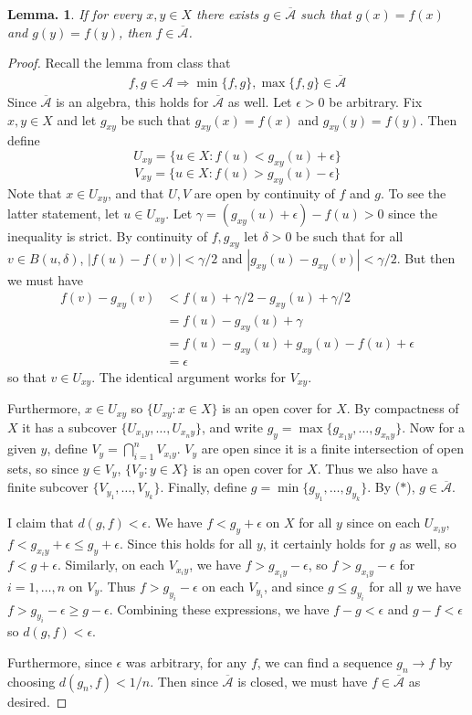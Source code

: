 \documentclass[11pt, a4paper]{memoir}
\theoremstyle{change}
\newtheorem{lemma}[theorem]{Lemma.}
\theoremstyle{plain}
\theoremstyle{nonumberplain}
\newtheorem{proof}{Proof}
\numberwithin{equation}{section}
\begin{document}
\begin{lemma}
    If for every $x,y\in X$ there exists $g\in\overline{\mathcal{A}}$ such that $g(x)=f(x)$ and $g(y)=f(y)$, then $f\in\overline{\mathcal{A}}$.
\end{lemma}
\begin{proof}
    Recall the lemma from class that
    \begin{align*}
        f,g\in\mathcal{A}\Rightarrow\min\{f,g\},\max\{f,g\}\in\overline{\mathcal{A}}\tag{$*$}
    \end{align*}
    Since $\overline{\mathcal{A}}$ is an algebra, this holds for $\overline{\mathcal{A}}$ as well.
    Let $\epsilon>0$ be arbitrary.
    Fix $x,y\in X$ and let $g_{xy}$ be such that $g_{xy}(x)=f(x)$ and $g_{xy}(y)=f(y)$.
    Then define
    \[U_{xy}=\{u\in X:f(u)<g_{xy}(u)+\epsilon\}\]
    \[V_{xy}=\{u\in X:f(u)>g_{xy}(u)-\epsilon\}\]
    Note that $x\in U_{xy}$, and that $U,V$ are open by continuity of $f$ and $g$.
    To see the latter statement, let $u\in U_{xy}$.
    Let $\gamma=(g_{xy}(u)+\epsilon)-f(u)>0$ since the inequality is strict.
    By continuity of $f,g_{xy}$ let $\delta>0$ be such that for all $v\in B(u,\delta)$, $|f(u)-f(v)|<\gamma/2$ and $|g_{xy}(u)-g_{xy}(v)|<\gamma/2$.
    But then we must have
    \begin{align*}
        f(v)-g_{xy}(v) &< f(u)+\gamma/2-g_{xy}(u)+\gamma/2\\
                       &= f(u)-g_{xy}(u)+\gamma\\
                       &= f(u)-g_{xy}(u)+g_{xy}(u)-f(u)+\epsilon\\
                       &= \epsilon
    \end{align*}
    so that $v\in U_{xy}$.
    The identical argument works for $V_{xy}$.

    Furthermore, $x\in U_{xy}$ so $\{U_{xy}:x\in X\}$ is an open cover for $X$.
    By compactness of $X$ it has a subcover $\{U_{x_1y},\ldots,U_{x_ny}\}$, and write $g_y=\max\{g_{x_1y},\ldots,g_{x_ny}\}$.
    Now for a given $y$, define $V_y=\bigcap\limits_{i=1}^n V_{x_iy}$.
    $V_y$ are open since it is a finite intersection of open sets, so since $y\in V_y$, $\{V_y:y\in X\}$ is an open cover for $X$.
    Thus we also have a finite subcover $\{V_{y_1},\ldots,V_{y_k}\}$.
    Finally, define $g=\min\{g_{y_1},\ldots,g_{y_k}\}$.
    By ($*$), $g\in\mathcal{\overline{A}}$.

    I claim that $d(g,f)<\epsilon$.
    We have $f<g_y+\epsilon$ on $X$ for all $y$ since on each $U_{x_iy}$, $f<g_{x_iy}+\epsilon\leq g_y+\epsilon$.
    Since this holds for all $y$, it certainly holds for $g$ as well, so $f<g+\epsilon$.
    Similarly, on each $V_{x_iy}$, we have $f>g_{x_iy}-\epsilon$, so $f>g_{x_iy}-\epsilon$ for $i=1,\ldots,n$ on $V_y$.
    Thus $f>g_{y_i}-\epsilon$ on each $V_{y_i}$, and since $g\leq g_{y_i}$ for all $y$ we have $f>g_{y_i}-\epsilon\geq g-\epsilon$.
    Combining these expressions, we have $f-g<\epsilon$ and $g-f<\epsilon$ so $d(g,f)<\epsilon$.

    Furthermore, since $\epsilon$ was arbitrary, for any $f$, we can find a sequence $g_n\to f$ by choosing $d(g_n,f)<1/n$.
    Then since $\overline{\mathcal{A}}$ is closed, we must have $f\in\overline{\mathcal{A}}$ as desired.
\end{proof}
\end{document}
